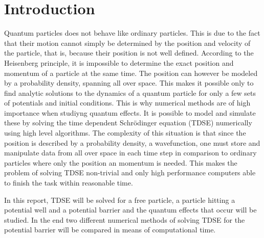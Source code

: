 \section{Introduction}

Quantum particles does not behave like ordinary particles. This is due to the fact that their motion cannot simply be determined by the position and velocity of the particle, that is, because their position is not well defined. According to the Heisenberg principle, it is impossible to determine the exact position and momentum of a particle at the same time. The position can however be modeled by a probability density, spanning all over space. This makes it possible only to find analytic solutions to the dynamics of a quantum particle for only a few sets of potentials and initial conditions. This is why numerical methods are of high importance when studiyng quantum effects. It is possible to model and simulate these by solving the time dependent Schrödinger equation (TDSE) numerically using high level algorithms. The complexity of this situation is that since the position is described by a probability density, a wavefunction, one must store and manipulate data from all over space in each time step in comparison to ordinary particles where only the position an momentum is needed. This makes the problem of solving TDSE non-trivial and only high performance computers able to finish the task within reasonable time.

In this report, TDSE will be solved for a free particle, a particle hitting a potential well and a potential barrier and the quantum effects that occur will be studied. In the end two different numerical methods of solving TDSE for the potential barrier will be compared in means of computational time.
